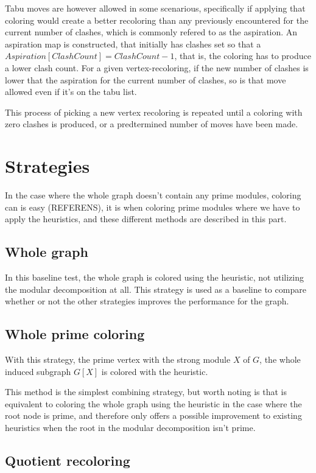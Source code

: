 \documentclass{amsart}
\begin{document}
Tabu moves are however allowed in some scenarious, specifically if applying that
coloring would create a better recoloring than any previously encountered for
the current number of clashes, which is commonly refered to as the aspiration.
An aspiration map is constructed, that initially has clashes set so that a 
$Aspiration[ClashCount] = ClashCount-1$, that is, the coloring has to produce a
lower clash count. For a given vertex-recoloring, if the new number of clashes
is lower that the aspiration for the current number of clashes, so is that move
allowed even if it's on the tabu list.

This process of picking a new vertex recoloring is repeated until a coloring
with zero clashes is produced, or a predtermined number of moves have been made. 

\section{Strategies}
\label{sec:Strategies}
In the case where the whole graph doesn't contain any prime modules, coloring
can is easy (REFERENS), it is when coloring prime modules where we have to apply
the heuristics, and these different methods are described in this part.

\subsection{Whole graph}

In this baseline test, the whole graph is colored using the heuristic, not
utilizing the modular decomposition at all. This strategy is used as a baseline
to compare whether or not the other strategies improves the performance for the
graph.

\subsection{Whole prime coloring}

With this strategy, the prime vertex with the strong module $X$ of $G$, the
whole induced subgraph $G[X]$ is colored with the heuristic.

This method is the simplest combining strategy, but worth noting is that is
equivalent to coloring the whole graph using the heuristic in the case where the
root node is prime, and therefore only offers a possible improvement to existing
heuristics when the root in the modular decomposition isn't prime.

\subsection{Quotient recoloring}
\end{document}
